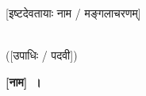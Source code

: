 
\onehalfspacing
\begin{center}
  [इष्टदेवतायाः नाम / मङ्गलाचरणम्]\\
  \vspace{2mm}
  \noindent\fbox{\LARGE [शीर्षकम् / भूमिका]}\\
\end{center}

{\la
[अत्र भूमिकायाः मुख्यपाठः लेखनीयः~।]
}

%
%

\vspace{4mm}
\begin{center}
  ([उपाधिः / पदवी])
\end{center}
\hfill{\Large \textbf{[नाम]~।}}

\newpage